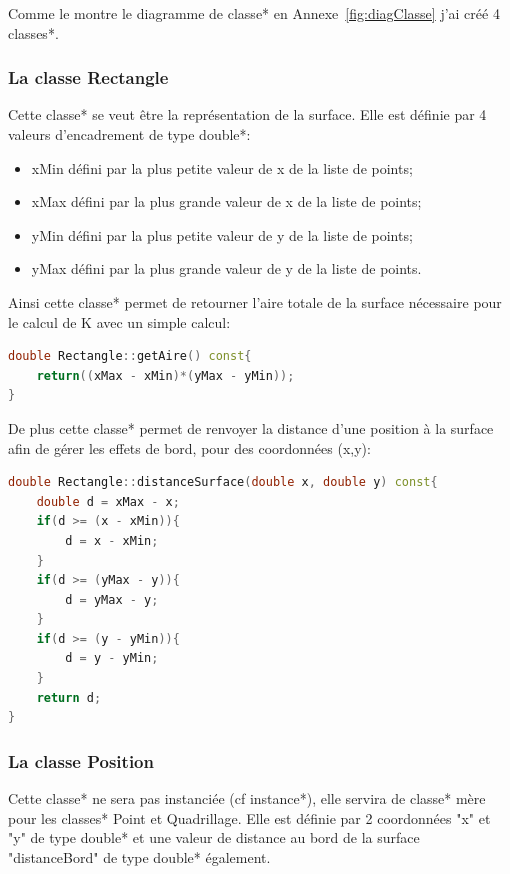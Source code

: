 \documentclass[stage2a]{tnreport}
\begin{document}
Comme le montre le diagramme de \gls{classe}* en Annexe~\ref{fig:diagClasse} j'ai créé 4 \gls{classe}s*.

\subsubsection{La classe Rectangle}
Cette \gls{classe}* se veut être la représentation de la surface. Elle est définie par 4 valeurs d'encadrement de type \gls{double}*:
\begin{itemize}
\item xMin défini par la plus petite valeur de x de la liste de points;
\item xMax défini par la plus grande valeur de x de la liste de points;
\item yMin défini par la plus petite valeur de y de la liste de points;
\item yMax défini par la plus grande valeur de y de la liste de points.\\
\end{itemize}

Ainsi cette \gls{classe}* permet de retourner l'aire totale de la surface nécessaire pour le calcul de K avec un simple calcul:
\begin{lstlisting}[language=C++, caption={Méthode donnant l'aire de la surface}, label={lst:aireSurface}]
double Rectangle::getAire() const{
	return((xMax - xMin)*(yMax - yMin));
}
\end{lstlisting}
    
De plus cette \gls{classe}* permet de renvoyer la distance d'une position à la surface afin de gérer les effets de bord, pour des coordonnées (x,y):
\begin{lstlisting}[language=C++, caption={Méthode donnant la distance d'un point à la surface}, label={lst:distanceSurface}]
double Rectangle::distanceSurface(double x, double y) const{
	double d = xMax - x;
	if(d >= (x - xMin)){
		d = x - xMin;
	}
	if(d >= (yMax - y)){
		d = yMax - y;
	}
	if(d >= (y - yMin)){
		d = y - yMin;
	}
	return d;
}
\end{lstlisting}

\subsubsection{La classe Position}
Cette \gls{classe}* ne sera pas instanciée (cf \gls{instance}*), elle servira de \gls{classe}* mère pour les \gls{classe}s* Point et Quadrillage. Elle est définie par 2 coordonnées "x" et "y" de type \gls{double}* et une valeur de distance au bord de la surface "distanceBord" de type \gls{double}* également.\\
\end{document}
